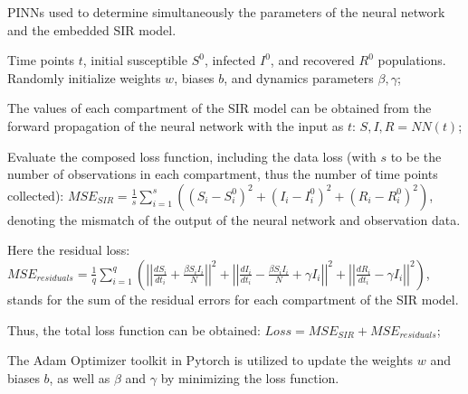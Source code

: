 \documentclass[12pt]{article}
\begin{document}
\begin{algorithm}
\caption{PINNs used to determine simultaneously the parameters of the neural network and the embedded SIR model.}
\begin{algorithmic}[1]

\Require Time points $t$, initial susceptible $S^0$, infected $I^0$, and recovered $R^0$ populations.
\State Randomly initialize weights $w$, biases $b$, and dynamics parameters $\beta, \gamma$;

    \State The values of each compartment of the SIR model can be obtained from the forward propagation of the neural network with the input as $t$:
    \State $S, I, R = NN(t)$;
    
    \State Evaluate the composed loss function, including the data loss (with $s$ to be the number of observations in each compartment, thus the number of time points collected):
    \State $MSE_{SIR} = \frac{1}{s}\sum_{i=1}^{s} \left((S_i - S_i^0)^2 + (I_i - I_i^0)^2 + (R_i - R_i^0)^2\right)$, denoting the mismatch of the output of the neural network and observation data.
    
    \State Here the residual loss:
    \State $MSE_{residuals} = \frac{1}{q}\sum_{i=1}^{q} \left(\left|\left|\frac{dS_i}{dt_i} + \frac{\beta S_i I_i}{N}\right|\right|^2 + \left|\left|\frac{dI_i}{dt_i} - \frac{\beta S_i I_i}{N} + \gamma I_i\right|\right|^2 + \left|\left|\frac{dR_i}{dt_i} - \gamma I_i\right|\right|^2\right)$,
    \State stands for the sum of the residual errors for each compartment of the SIR model.
    
    \State Thus, the total loss function can be obtained:
    \State $Loss = MSE_{SIR} + MSE_{residuals}$;
    
    \State The Adam Optimizer toolkit in Pytorch is utilized to update the weights $w$ and biases $b$, as well as $\beta$ and $\gamma$ by minimizing the loss function.
\EndFor

\end{algorithmic}
\end{algorithm}
\end{document}
